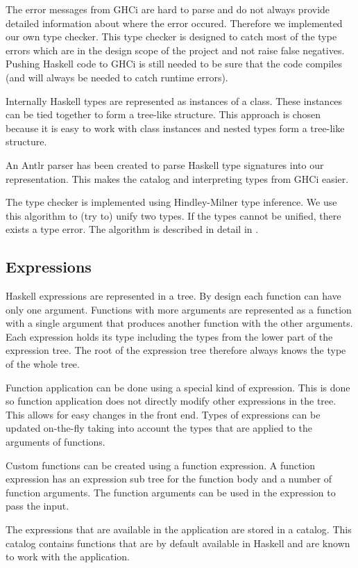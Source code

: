 The error messages from GHCi are hard to parse and do not always provide detailed information about where the error
occured. Therefore we implemented our own type checker. This type checker is designed to catch most of the type errors 
which are in the design scope of the project and not raise false negatives. Pushing Haskell code to GHCi is still needed
to be sure that the code compiles (and will always be needed to catch runtime errors).

Internally Haskell types are represented as instances of a class. These instances can be tied together to form a
tree-like structure. This approach is chosen because it is easy to work with class instances and nested types form
a tree-like structure. 

An Antlr parser has been created to parse Haskell type signatures into our representation. This makes the catalog and interpreting types from GHCi easier.

The type checker is implemented using Hindley-Milner type inference. We use this algorithm to (try to) unify two
types. If the types cannot be unified, there exists a type error. The algorithm is described in detail in
\cite{borisov}.  

\subsection{Expressions}

Haskell expressions are represented in a tree.
By design each function can have only one argument.
Functions with more arguments are represented as a function with a single argument that produces another function with the other arguments.
Each expression holds its type including the types from the lower part of the expression tree. The root of the
expression tree therefore always knows the type of the whole tree.

Function application can be done using a special kind of expression.
This is done so function application does not directly modify other expressions in the tree.
This allows for easy changes in the front end.
Types of expressions can be updated on-the-fly taking into account the types that are applied to the arguments of functions.

Custom functions can be created using a function expression.
A function expression has an expression sub tree for the function body and a number of function arguments.
The function arguments can be used in the expression to pass the input.

The expressions that are available in the application are stored in a catalog. This catalog contains functions that are
by default available in Haskell and are known to work with the application.
